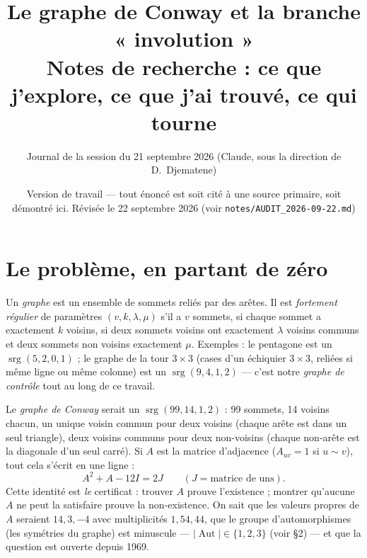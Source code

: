 \documentclass[11pt,a4paper]{article}
\title{Le graphe de Conway et la branche « involution »\\ \large Notes de recherche : ce que j'explore, ce que j'ai trouvé, ce qui tourne}
\author{Journal de la session du 21 septembre 2026 (Claude, sous la direction de D.~Djematene)}
\date{Version de travail --- tout énoncé est soit cité à une source primaire, soit démontré ici. Révisée le 22 septembre 2026 (voir \texttt{notes/AUDIT\_2026-09-22.md})}
\theoremstyle{definition}
\theoremstyle{remark}
\newcommand{\srg}{\operatorname{srg}}
\newcommand{\Aut}{\operatorname{Aut}}
\begin{document}
\maketitle

\section{Le problème, en partant de zéro}
Un \emph{graphe} est un ensemble de sommets reliés par des arêtes. Il est \emph{fortement régulier} de paramètres $(v,k,\lambda,\mu)$ s'il a $v$ sommets,
si chaque sommet a exactement $k$ voisins, si deux sommets voisins ont exactement $\lambda$ voisins communs et deux sommets non voisins exactement $\mu$.
Exemples : le pentagone est un $\srg(5,2,0,1)$ ; le graphe de la tour $3\times3$ (cases d'un échiquier $3\times 3$, reliées si même ligne ou même colonne)
est un $\srg(9,4,1,2)$ --- c'est notre \emph{graphe de contrôle} tout au long de ce travail.

Le \emph{graphe de Conway} serait un $\srg(99,14,1,2)$ : 99 sommets, 14 voisins chacun, un unique voisin commun pour deux voisins (chaque arête est dans
un seul triangle), deux voisins communs pour deux non-voisins (chaque non-arête est la diagonale d'un seul carré). Si $A$ est la matrice d'adjacence
($A_{uv}=1$ si $u\sim v$), tout cela s'écrit en une ligne :
\[
A^2+A-12I=2J\qquad(J=\text{matrice de uns}).
\]
Cette identité est \emph{le} certificat : trouver $A$ prouve l'existence ; montrer qu'aucune $A$ ne peut la satisfaire prouve la non-existence.
On sait que les valeurs propres de $A$ seraient $14,3,-4$ avec multiplicités $1,54,44$, que le groupe d'automorphismes (les symétries du graphe) est
minuscule --- $|\Aut|\in\{1,2,3\}$ (voir §2) --- et que la question est ouverte depuis 1969.
\end{document}
